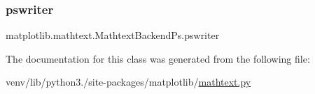 \subsubsection{\texorpdfstring{pswriter}{pswriter}}
{\footnotesize\ttfamily matplotlib.\+mathtext.\+Mathtext\+Backend\+Ps.\+pswriter}



The documentation for this class was generated from the following file\+:\begin{DoxyCompactItemize}
\item 
venv/lib/python3./site-\/packages/matplotlib/\hyperlink{mathtext_8py}{mathtext.\+py}\end{DoxyCompactItemize}
